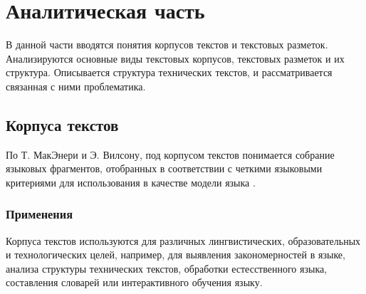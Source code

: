\section{Аналитическая часть}

В данной части вводятся понятия корпусов текстов и текстовых разметок.
Анализируются основные виды текстовых корпусов, текстовых разметок и их структура.
Описывается структура технических текстов, и рассматривается связанная с ними проблематика.

\subsection{Корпуса текстов}



По Т. МакЭнери и Э. Вилсону, под корпусом текстов понимается {собрание языковых фрагментов, отобранных в соответствии с четкими языковыми критериями для использования в качестве модели языка} \cite{kl}.

\subsubsection{Применения}

Корпуса текстов используются для различных лингвистических, образовательных и технологических целей, например, для выявления закономерностей в языке, анализа структуры технических текстов, обработки естесственного языка, составления словарей или интерактивного обучения языку.


